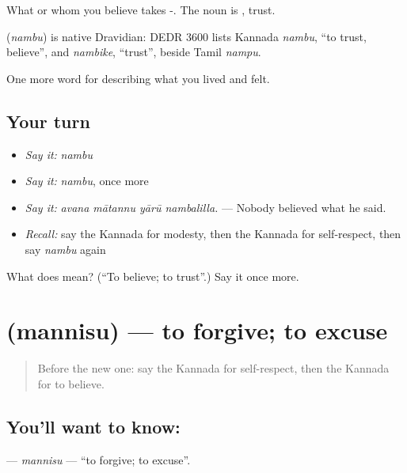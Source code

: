 What or whom you believe takes -. The noun is , trust.

\begin{cousinweb}
\textbf{} (\emph{nambu}) is native Dravidian: DEDR 3600 lists Kannada \emph{nambu}, \textquotedblleft{}to trust, believe\textquotedblright{}, and \emph{nambike}, \textquotedblleft{}trust\textquotedblright{}, beside Tamil \emph{nampu}.
\end{cousinweb}

\begin{grammarlens}[title={What you've built}]
One more word for describing what you lived and felt.
\end{grammarlens}

\subsection*{Your turn}
\begin{itemize}
\raggedright
  \item \emph{Say it:} \emph{nambu}
  \item \emph{Say it:} \emph{nambu}, once more
  \item \emph{Say it:} \emph{avana mātannu yārū nambalilla.} — Nobody believed what he said.
  \item \emph{Recall:} say the Kannada for modesty, then the Kannada for self-respect, then say \emph{nambu} again
\end{itemize}

\begin{tcolorbox}[breakable,colback=teal!4,colframe=teal!35!black,title={Before you move on}]
What does  mean? (\textquotedblleft{}To believe; to trust\textquotedblright{}.) Say it once more.
\end{tcolorbox}
\section[\texorpdfstring{\kn{ಮನ್ನಿಸು} (mannisu)}{ಮನ್ನಿಸು (mannisu)}]{ (mannisu) — to forgive; to excuse}

\label{lesson:KA-C498-mannisu}



\begin{quote}
Before the new one: say the Kannada for self-respect, then the Kannada for to believe.
\end{quote}

\subsection*{You'll want to know: }
\textbf{} — \emph{mannisu} — \textquotedblleft{}to forgive; to excuse\textquotedblright{}.

